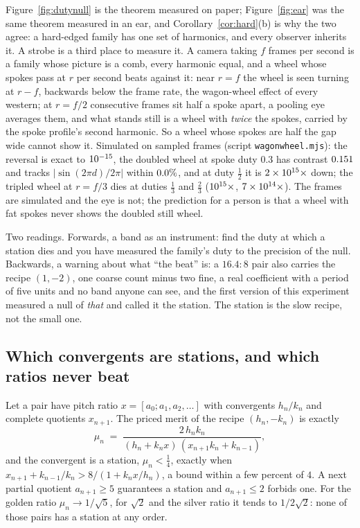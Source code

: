 Figure~\ref{fig:dutynull} is the theorem measured on paper;
Figure~\ref{fig:ear} was the same theorem measured in an ear, and
Corollary~\ref{cor:hard}(b) is why the two agree: a hard-edged family has
one set of harmonics, and every observer inherits it. A strobe is a third
place to measure it. A camera taking $f$ frames per second is a family
whose picture is a comb, every harmonic equal, and a wheel whose spokes
pass at $r$ per second beats against it: near $r=f$ the wheel is seen
turning at $r-f$, backwards below the frame rate, the wagon-wheel effect
of every western; at $r=f/2$ consecutive frames sit half a spoke apart, a
pooling eye averages them, and what stands still is a wheel with
\emph{twice} the spokes, carried by the spoke profile's second harmonic.
So a wheel whose spokes are half the gap wide cannot show it. Simulated
on sampled frames (script \texttt{wagonwheel.mjs}): the reversal is exact
to $10^{-15}$, the doubled wheel at spoke duty $0.3$ has contrast
$0.151$ and tracks $|\sin(2\pi d)/2\pi|$ within
$0.0\%$, and at duty $\tfrac12$ it is $2\times 10^{15}\times$
down; the tripled wheel at $r=f/3$ dies at duties $\tfrac13$ and
$\tfrac23$ ($10^{15}\times$, $7\times 10^{14}\times$).
The frames are simulated and the eye is not; the prediction for a person
is that a wheel with fat spokes never shows the doubled still wheel.

Two readings. Forwards, a band as an instrument: find the duty at which a
station dies and you have measured the family's duty to the precision of
the null. Backwards, a warning about what ``the beat'' is: a $16.4{:}8$
pair also carries the recipe $(1,-2)$, one coarse count minus two fine, a
real coefficient with a period of five units and no band anyone can see,
and the first version of this experiment measured a null of \emph{that}
and called it the station. The station is the slow recipe, not the small
one.

\subsection{Which convergents are stations, and which ratios never beat}
\label{sec:stations}

\begin{proposition}
\label{prop:stations}
Let a pair have pitch ratio $x=[a_0;a_1,a_2,\dots]$ with convergents
$h_n/k_n$ and complete quotients $x_{n+1}$. The priced merit of the recipe
$(h_n,-k_n)$ is exactly
\[
  \mu_n\;=\;\frac{2\,h_nk_n}{(h_n+k_nx)\,(x_{n+1}k_n+k_{n-1})},
\]
and the convergent is a station, $\mu_n<\tfrac14$, exactly when
$x_{n+1}+k_{n-1}/k_n>8/(1+k_nx/h_n)$, a bound within a few percent of $4$.
A next partial quotient $a_{n+1}\ge5$ guarantees a station and
$a_{n+1}\le2$ forbids one. For the golden ratio $\mu_n\to1/\sqrt5$, for
$\sqrt2$ and the silver ratio it tends to $1/2\sqrt2$: none of those pairs
has a station at any order.
\end{proposition}

